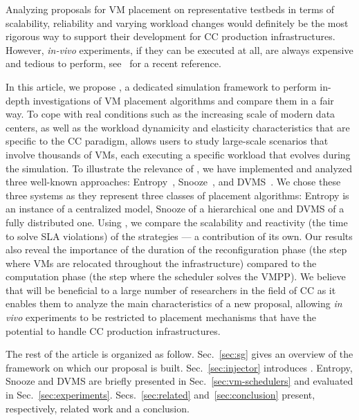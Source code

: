 Analyzing proposals for VM placement on representative testbeds in
terms of scalability, reliability and varying workload changes would
definitely be the most rigorous way to support their development for
CC production infrastructures.
However, \textit{in-vivo} experiments, if they can be executed at all,
are always expensive and tedious to perform,
see~\cite{barker:pitfalls} for a recent reference.

In this article, we propose \vmps, a dedicated simulation framework to
perform in-depth investigations of VM placement algorithms and compare
them in a fair way. To cope with real conditions such as the
increasing scale of modern data centers, as well as the workload
dynamicity and elasticity characteristics that are specific to the CC
paradigm, \vmps allows users to study large-scale scenarios
that involve thousands of VMs,
each executing a specific workload that evolves during the
simulation.
%
%
To illustrate the relevance of \vmps, we have implemented and analyzed
three well-known approaches:
Entropy~\cite{Hermenier:2009:ECM:1508293.1508300},
Snooze~\cite{feller:ccgrid12}, and DVMS~\cite{quesnel:cpe2012}.
We chose these three systems as they represent three classes of
placement algorithms: Entropy is an instance of a centralized model,
Snooze of a hierarchical one and DVMS of a fully distributed one.
Using \vmps, we compare the scalability and reactivity (\ie the time
to solve SLA violations) of the strategies --- a contribution of its
own.  Our results also reveal the importance of the duration of the
reconfiguration phase (\ie the step where VMs are relocated throughout
the infrastructure) compared to the computation phase (\ie the step
where the scheduler solves the VMPP).
%
%
We believe that \vmps will be beneficial to a large number of
researchers in the field of CC as it enables them to analyze the main
characteristics of a new proposal, allowing \textit{in vivo}
experiments to be restricted to placement mechanisms that have the
potential to handle CC production infrastructures.

The rest of the article is
organized as follow.
Sec.~\ref{sec:sg} gives an overview of the \sg
framework on which our proposal is built. Sec.~\ref{sec:injector}
introduces \vmps.
Entropy, Snooze and DVMS are briefly presented in
Sec.~\ref{sec:vm-schedulers} and evaluated in
Sec.~\ref{sec:experiments}. Secs.~\ref{sec:related}
and~\ref{sec:conclusion} present, respectively, related work and a
conclusion.




